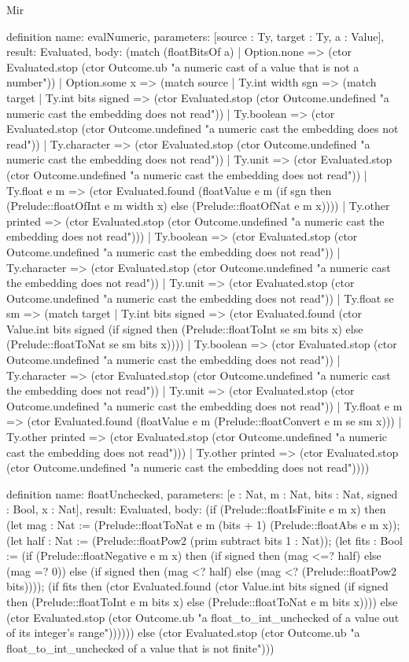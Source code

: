 \begin{lexlean}{Mir}
\begin{semanticmodule}
definition{
  name: evalNumeric,
  parameters: [source : Ty, target : Ty, a : Value],
  result: Evaluated,
  body: (match (floatBitsOf a)
    | Option.none => (ctor Evaluated.stop (ctor Outcome.ub "a numeric cast of a value that is not a number"))
    | Option.some x => (match source
      | Ty.int width sgn => (match target
        | Ty.int bits signed => (ctor Evaluated.stop (ctor Outcome.undefined "a numeric cast the embedding does not read"))
        | Ty.boolean => (ctor Evaluated.stop (ctor Outcome.undefined "a numeric cast the embedding does not read"))
        | Ty.character => (ctor Evaluated.stop (ctor Outcome.undefined "a numeric cast the embedding does not read"))
        | Ty.unit => (ctor Evaluated.stop (ctor Outcome.undefined "a numeric cast the embedding does not read"))
        | Ty.float e m => (ctor Evaluated.found (floatValue e m (if sgn then (Prelude::floatOfInt e m width x) else (Prelude::floatOfNat e m x))))
        | Ty.other printed => (ctor Evaluated.stop (ctor Outcome.undefined "a numeric cast the embedding does not read")))
      | Ty.boolean => (ctor Evaluated.stop (ctor Outcome.undefined "a numeric cast the embedding does not read"))
      | Ty.character => (ctor Evaluated.stop (ctor Outcome.undefined "a numeric cast the embedding does not read"))
      | Ty.unit => (ctor Evaluated.stop (ctor Outcome.undefined "a numeric cast the embedding does not read"))
      | Ty.float se sm => (match target
        | Ty.int bits signed => (ctor Evaluated.found (ctor Value.int bits signed (if signed then (Prelude::floatToInt se sm bits x) else (Prelude::floatToNat se sm bits x))))
        | Ty.boolean => (ctor Evaluated.stop (ctor Outcome.undefined "a numeric cast the embedding does not read"))
        | Ty.character => (ctor Evaluated.stop (ctor Outcome.undefined "a numeric cast the embedding does not read"))
        | Ty.unit => (ctor Evaluated.stop (ctor Outcome.undefined "a numeric cast the embedding does not read"))
        | Ty.float e m => (ctor Evaluated.found (floatValue e m (Prelude::floatConvert e m se sm x)))
        | Ty.other printed => (ctor Evaluated.stop (ctor Outcome.undefined "a numeric cast the embedding does not read")))
      | Ty.other printed => (ctor Evaluated.stop (ctor Outcome.undefined "a numeric cast the embedding does not read"))))
}

definition{
  name: floatUnchecked,
  parameters: [e : Nat, m : Nat, bits : Nat, signed : Bool, x : Nat],
  result: Evaluated,
  body: (if (Prelude::floatIsFinite e m x) then (let mag : Nat := (Prelude::floatToNat e m (bits + 1) (Prelude::floatAbs e m x)); (let half : Nat := (Prelude::floatPow2 (prim subtract bits 1 : Nat)); (let fits : Bool := (if (Prelude::floatNegative e m x) then (if signed then (mag <=? half) else (mag =? 0)) else (if signed then (mag <? half) else (mag <? (Prelude::floatPow2 bits)))); (if fits then (ctor Evaluated.found (ctor Value.int bits signed (if signed then (Prelude::floatToInt e m bits x) else (Prelude::floatToNat e m bits x)))) else (ctor Evaluated.stop (ctor Outcome.ub "a float_to_int_unchecked of a value out of its integer's range")))))) else (ctor Evaluated.stop (ctor Outcome.ub "a float_to_int_unchecked of a value that is not finite")))
}


\end{semanticmodule}
\end{lexlean}
